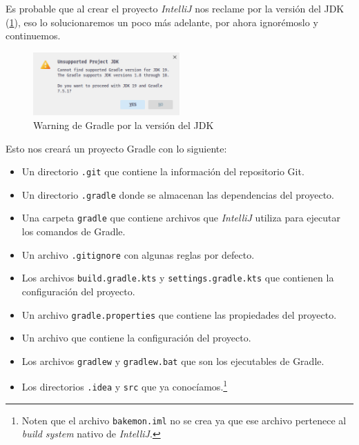   Es probable que al crear el proyecto \textit{IntelliJ} nos reclame por la versión del JDK
  (\cref{fig:gradle-jdk}), eso lo solucionaremos un poco más adelante, por ahora ignorémoslo y 
  continuemos.

  \begin{figure}[ht!]
    \centering
    \includegraphics[width=0.5\textwidth]{img/oop/tdd/gradle/gradle-jdk.png}
    \caption{Warning de Gradle por la versión del JDK}
    \label{fig:gradle-jdk}
  \end{figure}

  Esto nos creará un proyecto Gradle con lo siguiente:

  \begin{itemize}
    \item Un directorio \texttt{.git} que contiene la información del repositorio Git.
    \item Un directorio \texttt{.gradle} donde se almacenan las dependencias del proyecto.
    \item Una carpeta \texttt{gradle} que contiene archivos que \textit{IntelliJ} utiliza para
      ejecutar los comandos de Gradle.
    \item Un archivo \texttt{.gitignore} con algunas reglas por defecto.
    \item Los archivos \texttt{build.gradle.kts} y \texttt{settings.gradle.kts} que contienen la 
      configuración del proyecto.
    \item Un archivo \texttt{gradle.properties} que contiene las propiedades del proyecto.
    \item Un archivo  que contiene la configuración del proyecto.
    \item Los archivos \texttt{gradlew} y \texttt{gradlew.bat} que son los ejecutables de Gradle.
    \item Los directorios \texttt{.idea} y \texttt{src} que ya conocíamos.\footnote{
      Noten que el archivo \texttt{bakemon.iml} no se crea ya que ese archivo pertenece al
      \textit{build system} nativo de \textit{IntelliJ}.
    }
  \end{itemize}

